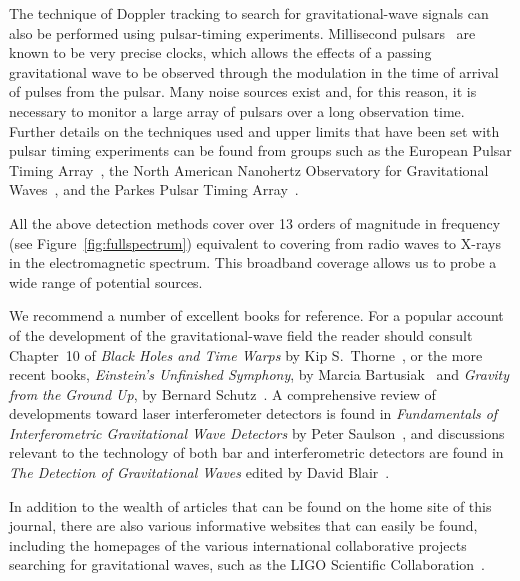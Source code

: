 The technique of Doppler tracking to search for gravitational-wave signals can
also be performed using pulsar-timing experiments.  Millisecond
pulsars~\cite{Lorimer:2008} are known to be very precise clocks, which
allows the effects of a passing gravitational wave to be observed
through the modulation in the time of arrival of pulses from the
pulsar. Many noise sources exist and, for this reason, it is necessary
to monitor a large array of pulsars over a long observation time.
Further details on the techniques used and upper limits that have been
set with pulsar timing experiments can be found from groups such as
the European Pulsar Timing Array~\cite{Janssen:2008}, the North
American Nanohertz Observatory for Gravitational
Waves~\cite{Jenet:2006,Jenet:2009}, and the Parkes Pulsar Timing
Array~\cite{Hobbs:2008}.


All the above detection methods cover over 13 orders of magnitude in frequency
(see Figure~\ref{fig:fullspectrum}) equivalent to covering from radio waves to
X-rays in the electromagnetic spectrum.  This broadband coverage allows us to
probe a wide range of potential sources.

We recommend a number of excellent books for reference. For a popular account of
the development of the gravitational-wave field the reader should consult
Chapter~10 of \textit{Black Holes and Time Warps} by Kip S.\ Thorne~\cite{Thorne}, or
the more recent books, \textit{Einstein's Unfinished Symphony}, by Marcia
Bartusiak~\cite{Bartusiak:2000} and \textit{Gravity from the Ground Up}, by Bernard
Schutz~\cite{Schutz:2003}. A comprehensive review of developments toward laser
interferometer detectors is found in \textit{Fundamentals of Interferometric
Gravitational Wave Detectors} by Peter Saulson~\cite{Saulsonbook}, and
discussions relevant to the technology of both bar and interferometric detectors
are found in \textit{The Detection of Gravitational Waves} edited by David
Blair~\cite{Blair}.


In addition to the wealth of articles that can be found on the home site of
this journal, there are also various informative websites that can easily be
found, including the homepages of the various international collaborative
projects searching for gravitational waves, such as the LIGO Scientific
Collaboration~\cite{LSCweb}.


  
  